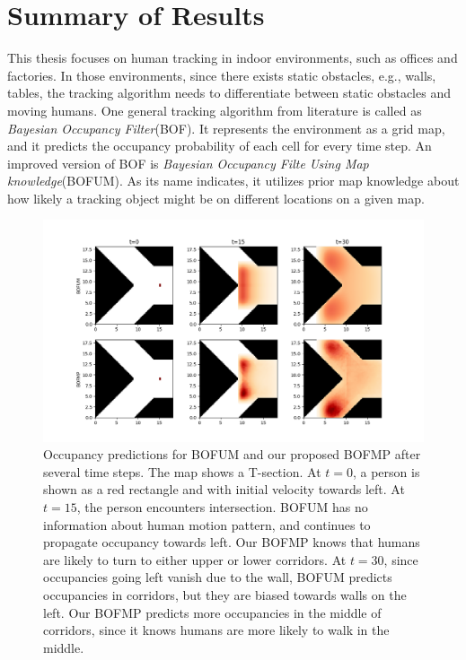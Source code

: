 \chapter{Summary of Results}

This thesis focuses on human tracking in indoor environments, such as offices and factories. In those environments, since there exists static obstacles, e.g., walls, tables, the tracking algorithm needs to differentiate between static obstacles and moving humans. One general tracking algorithm from literature is called as \textit{Bayesian Occupancy Filter}(BOF). It represents the environment as a grid map, and it predicts the occupancy probability of each cell for every time step. An improved version of BOF is \textit{Bayesian Occupancy Filte Using Map knowledge}(BOFUM). As its name indicates, it utilizes prior map knowledge about how likely a tracking object might be on different locations on a given map. 

\begin{figure}[ht]
  \centering
   \captionsetup{width=\linewidth}
    \includegraphics[width=\textwidth]{figures/idea.png}
    \caption{Occupancy predictions for BOFUM and our proposed BOFMP after several time steps. The map shows a T-section. At $t=0$, a person is shown as a red rectangle and with initial velocity towards left. At $t=15$, the person encounters intersection. BOFUM has no information about human motion pattern, and continues to propagate occupancy towards left. Our BOFMP knows that humans are likely to turn to either upper or lower corridors. At $t=30$, since occupancies going left vanish due to the wall, BOFUM predicts occupancies in corridors, but they are biased towards walls on the left. Our BOFMP predicts more occupancies in the middle of corridors, since it knows humans are more likely to walk in the middle.}
    \label{fig:idea}
\end{figure}


